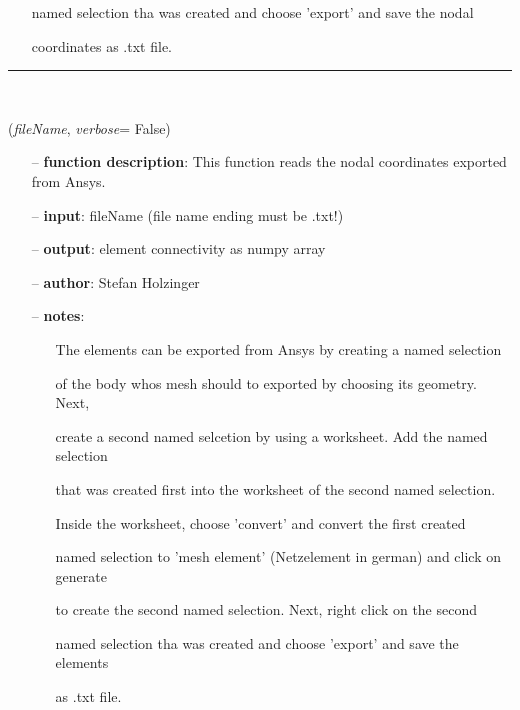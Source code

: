 \begin{itemize}[leftmargin=1.4cm]
\begin{itemize}[leftmargin=1.4cm]
\begin{itemize}[leftmargin=0.5cm]
\begin{itemize}[leftmargin=1.4cm]
\begin{itemize}[leftmargin=1.4cm]
\begin{itemize}[leftmargin=0.5cm]
\begin{itemize}[leftmargin=0.7cm]
\begin{itemize}[leftmargin=1.2cm]
\item[]named selection tha was created and choose 'export' and save the nodal
\item[]coordinates as .txt file.
\end{itemize}
\vspace{12pt}\end{itemize}
%
\noindent\rule{8cm}{0.75pt}\vspace{1pt} \\ 
\begin{flushleft}
\label{sec:FEM:ReadElementsFromAnsysTxt}
({\it fileName}, {\it verbose}= False)
\end{flushleft}
\setlength{\itemindent}{0.7cm}
\begin{itemize}[leftmargin=0.7cm]
\item[--]{\bf function description}: This function reads the nodal coordinates exported from Ansys.
\item[--]{\bf input}: fileName (file name ending must be .txt!)
\item[--]{\bf output}: element connectivity as numpy array
\item[--]{\bf author}: Stefan Holzinger
\item[--]{\bf notes}: \vspace{-6pt}
\begin{itemize}[leftmargin=1.2cm]
\setlength{\itemindent}{-0.7cm}
\item[]The elements can be exported from Ansys by creating a named selection
\item[]of the body whos mesh should to exported by choosing its geometry. Next,
\item[]create a second named selcetion by using a worksheet. Add the named selection
\item[]that was created first into the worksheet of the second named selection.
\item[]Inside the worksheet, choose 'convert' and convert the first created
\item[]named selection to 'mesh element' (Netzelement in german) and click on generate
\item[]to create the second named selection. Next, right click on the second
\item[]named selection tha was created and choose 'export' and save the elements
\item[]as .txt file.
\end{itemize}

\end{itemize}
\end{itemize}
\end{itemize}
\end{itemize}
\end{itemize}
\end{itemize}
\end{itemize}
